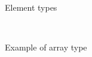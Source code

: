\documentclass[10pt,journal,compsoc]{joser1}
\begin{document}

\begin{figure}[htbp]
  \begin{center}
    \\
    \caption{Element types\label{fig:types}}
  \end{center}
\end{figure}


\begin{figure}[htbp]
   \begin{center}
     \\
     \caption{Example of array type\label{fig:image}}
   \end{center}
\end{figure}
\end{document}
